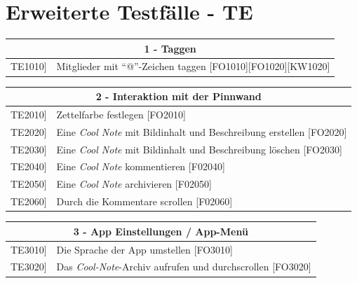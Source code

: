 \documentclass[a4paper]{scrreprt}
\begin{document}
	    \section{Erweiterte Testfälle - TE}
	    
	    \begin{table}[h]
	    	\centering
	    	\label{my-label}
	    	\begin{tabular}{p{2cm}p{12cm}}
	    		
	    		\multicolumn{2}{c}{\textbf{1 - Taggen}} \\ \hline
	    		\centering{[}TE1010{]} & Mitglieder mit ``@”-Zeichen taggen {[}FO1010{]}{[}FO1020{]}{[}KW1020{]}\\
	    		\hline
	    	\end{tabular}
	    \end{table}
	    
	    \vspace{5mm}
	    
	    \begin{table}[h!]
	    	\centering
	    	\label{my-label}
	    	\begin{tabular}{p{2cm}p{12cm}}
	    		
	    		\multicolumn{2}{c}{\textbf{2 - Interaktion mit der Pinnwand}} \\ \hline
	    		\centering{[}TE2010{]} & Zettelfarbe festlegen {[}FO2010{]}\\
	    		\centering{[}TE2020{]}& Eine \textit{Cool Note}  mit Bildinhalt und Beschreibung erstellen {[}FO2020{]}                             \\
	    		\centering{[}TE2030{]}& Eine \textit{Cool Note} mit Bildinhalt und Beschreibung löschen {[}FO2030{]}\\ 
	    		\centering{[}TE2040{]}& Eine \textit{Cool Note} kommentieren {[}F02040{]}  \\ 
	    		\centering{[}TE2050{]}& Eine \textit{Cool Note} archivieren {[}F02050{]}\\ 
	    		\centering{[}TE2060{]}& Durch die Kommentare scrollen {[}F02060{]}\\ 
	    		\hline
	    	\end{tabular}
	    \end{table}
	    
	    \vspace{5mm}
	    
	    \begin{table}[h!]
	    	\centering
	    	\label{my-label}
	    	\begin{tabular}{p{2cm}p{12cm}}
	    		
	    		\multicolumn{2}{c}{\textbf{3 - App Einstellungen / App-Menü}} \\ \hline
	    		\centering{[}TE3010{]} & Die Sprache der App umstellen {[}FO3010{]}\\
	    		\centering{[}TE3020{]} & Das \textit{Cool-Note}-Archiv aufrufen und durchscrollen {[}FO3020{]}\\
	    		\hline
	    	\end{tabular}
	    \end{table}
	    
\end{document}
